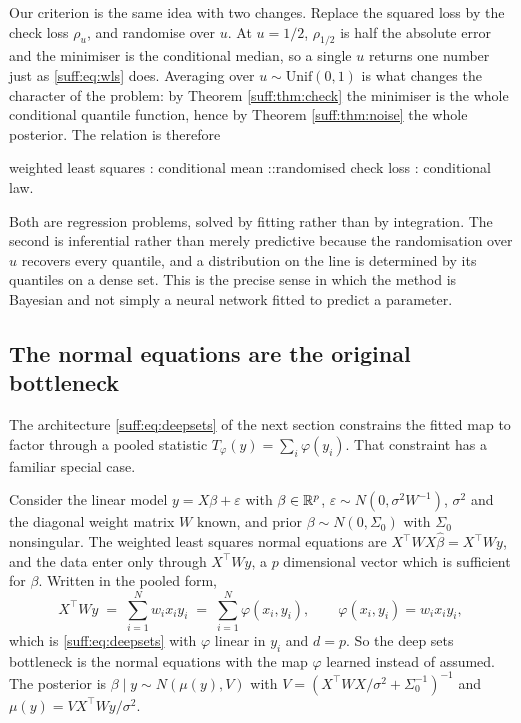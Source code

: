 Our criterion is the same idea with two changes. Replace the squared loss by the check loss
$\rho_u$, and randomise over $u$. At $u=1/2$, $\rho_{1/2}$ is half the absolute error and the
minimiser is the conditional median, so a single $u$ returns one number just as
\eqref{suff:eq:wls} does. Averaging over $u\sim\mathrm{Unif}(0,1)$ is what changes the
character of the problem: by Theorem \ref{suff:thm:check} the minimiser is the whole
conditional quantile function, hence by Theorem \ref{suff:thm:noise} the whole posterior. The
relation is therefore

\begin{center}
weighted least squares : conditional mean \quad::\quad randomised check loss : conditional law.
\end{center}

Both are regression problems, solved by fitting rather than by integration. The second is
inferential rather than merely predictive because the randomisation over $u$ recovers every
quantile, and a distribution on the line is determined by its quantiles on a dense set. This
is the precise sense in which the method is Bayesian and not simply a neural network fitted
to predict a parameter.

\subsection{The normal equations are the original bottleneck}

The architecture \eqref{suff:eq:deepsets} of the next section constrains the fitted map to
factor through a pooled statistic $T_\varphi(y)=\sum_i\varphi(y_i)$. That constraint has a
familiar special case.

Consider the linear model $y=X\beta+\varepsilon$ with $\beta\in\mathbb{R}^p$,
$\varepsilon\sim N(0,\sigma^2W^{-1})$, $\sigma^2$ and the diagonal weight matrix $W$ known,
and prior $\beta\sim N(0,\Sigma_0)$ with $\Sigma_0$ nonsingular. The weighted least squares
normal equations are $X^\top WX\hat\beta = X^\top Wy$, and the data enter only through
$X^\top Wy$, a $p$ dimensional vector which is sufficient for $\beta$. Written in the pooled
form,
\[
X^\top W y \;=\; \sum_{i=1}^{N} w_i x_i y_i \;=\; \sum_{i=1}^{N}\varphi(x_i,y_i),
\qquad \varphi(x_i,y_i)=w_ix_iy_i ,
\]
which is \eqref{suff:eq:deepsets} with $\varphi$ linear in $y_i$ and $d=p$. So the deep sets
bottleneck is the normal equations with the map $\varphi$ learned instead of assumed. The
posterior is $\beta\mid y\sim N(\mu(y),V)$ with $V=(X^\top WX/\sigma^2+\Sigma_0^{-1})^{-1}$
and $\mu(y)=VX^\top Wy/\sigma^2$.

